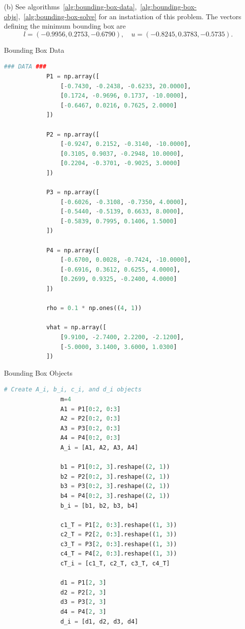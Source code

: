 \documentclass[12pt,reqno]{article}
\theoremstyle{definition}
\numberwithin{equation}{section}
\begin{document}
\noindent (b) See algorithms~\ref{alg:bounding-box-data},~\ref{alg:bounding-box-objs},~\ref{alg:bounding-box-solve} for an instatiation of this problem. The vectors defining the 
minimum bounding box are
\[l = (-0.9956, 0.2753, -0.6790), \quad u = (-0.8245, 0.3783, -0.5735).\]

\begin{algorithm}[htbp]
    \caption{Bounding Box Data}
    \centering
        \begin{lstlisting}[language=Python]
            ### DATA ###
            P1 = np.array([
                [-0.7430, -0.2438, -0.6233, 20.0000],
                [0.1724, -0.9696, 0.1737, -10.0000],
                [-0.6467, 0.0216, 0.7625, 2.0000]
            ])

            P2 = np.array([
                [-0.9247, 0.2152, -0.3140, -10.0000],
                [0.3105, 0.9037, -0.2948, 10.0000],
                [0.2204, -0.3701, -0.9025, 3.0000]
            ])

            P3 = np.array([
                [-0.6026, -0.3108, -0.7350, 4.0000],
                [-0.5440, -0.5139, 0.6633, 8.0000],
                [-0.5839, 0.7995, 0.1406, 1.5000]
            ])

            P4 = np.array([
                [-0.6700, 0.0028, -0.7424, -10.0000],
                [-0.6916, 0.3612, 0.6255, 4.0000],
                [0.2699, 0.9325, -0.2400, 4.0000]
            ])

            rho = 0.1 * np.ones((4, 1))

            vhat = np.array([
                [9.9100, -2.7400, 2.2200, -2.1200],
                [-5.0000, 3.1400, 3.6000, 1.0300]
            ])
        \end{lstlisting}
        \label{alg:bounding-box-data}
    \end{algorithm}

    \begin{algorithm}[htbp]
        \caption{Bounding Box Objects}
        \centering
            \begin{lstlisting}[language=Python]
                # Create A_i, b_i, c_i, and d_i objects
                m=4
                A1 = P1[0:2, 0:3]
                A2 = P2[0:2, 0:3]
                A3 = P3[0:2, 0:3]
                A4 = P4[0:2, 0:3]
                A_i = [A1, A2, A3, A4]

                b1 = P1[0:2, 3].reshape((2, 1))
                b2 = P2[0:2, 3].reshape((2, 1))
                b3 = P3[0:2, 3].reshape((2, 1))
                b4 = P4[0:2, 3].reshape((2, 1))
                b_i = [b1, b2, b3, b4]

                c1_T = P1[2, 0:3].reshape((1, 3))
                c2_T = P2[2, 0:3].reshape((1, 3))
                c3_T = P3[2, 0:3].reshape((1, 3))
                c4_T = P4[2, 0:3].reshape((1, 3))
                cT_i = [c1_T, c2_T, c3_T, c4_T]

                d1 = P1[2, 3]
                d2 = P2[2, 3]
                d3 = P3[2, 3]
                d4 = P4[2, 3]
                d_i = [d1, d2, d3, d4]
            \end{lstlisting}
            \label{alg:bounding-box-objs}
        \end{algorithm}
\end{document}
